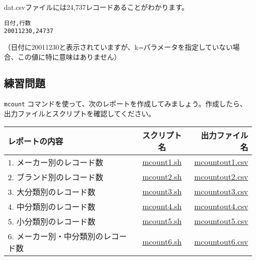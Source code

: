 \noindent
dat.csvファイルには24,737レコードあることがわかります。

\begin{verbatim}
日付,行数
20011230,24737
\end{verbatim}

（日付に20011230と表示されていますが、k=パラメータを指定していない場合、この値に特に意味はありません）

\newpage 

\subsection{練習問題 }

\verb|mcount| コマンドを使って、次のレポートを作成してみましょう。作成したら、出力ファイルとスクリプトを確認してください。

\begin{table}[htbp]
{\small
\begin{tabular}{ l | c || r }
\hline
\textbf{レポートの内容}   & \textbf{スクリプト名} & \textbf{出力ファイル名}  \\
\hline
1. メーカー別のレコード数 & \href{exercise/mcount1.sh}{mcount1.sh} & \href{exercise/outdat/mcountout1.csv}{mcountout1.csv} \\
2. ブランド別のレコード数 & \href{exercise/mcount2.sh}{mcount2.sh} & \href{exercise/outdat/mcountout2.csv}{mcountout2.csv} \\
3. 大分類別のレコード数 & \href{exercise/mcount3.sh}{mcount3.sh} & \href{exercise/outdat/mcountout3.csv}{mcountout3.csv} \\
4. 中分類別のレコード数 & \href{exercise/mcount4.sh}{mcount4.sh} & \href{exercise/outdat/mcountout4.csv}{mcountout4.csv} \\
5. 小分類別のレコード数 & \href{exercise/mcount5.sh}{mcount5.sh} & \href{exercise/outdat/mcountout5.csv}{mcountout5.csv} \\
6. メーカー別・中分類別のレコード数 & \href{exercise/mcount6.sh}{mcount6.sh} & \href{exercise/outdat/mcountout6.csv}{mcountout6.csv} \\

\hline
\end{tabular} 
}
\end{table} 


%
